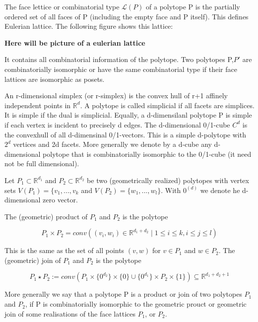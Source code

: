The face lettice or combinatorial type $\mathcal{L}(P)$ of a polytope P is the partially ordered set of all faces of P (including the empty face and P itself). This defines Eulerian lattice. The following figure shows this lattice:

\textbf{Here will be picture of a eulerian lattice}

It contains all combinatorial information of the polytope. Two polytopes P,$P'$ are combinatorially isomorphic or have the same combinatorial type if their face lattices are isomorphic as posets.

An r-dimensional simplex (or r-simplex) is the convex hull of r+1 affinely independent points in $\mathbb{R}^d$. A polytope is called simplicial if all facets are simplices. It is simple if the dual is simplicial. Equally, a d-dimensilanl polytope P is simple if each vertex is incident to precisely d edges. The d-dimensional 0/1-cube $C^d$ is the convexhull of all d-dimensinal 0/1-vectors. This is a simple d-polytope with $2^d$ vertices and 2d facets. More generally we denote by a d-cube any d-dimensional polytope that is combinatorially isomorphic to the 0/1-cube (it need not be full dimensional).

Let $P_1 \subset \mathbb{R}^{d_1}$ and $P_2 \subset \mathbb{R}^{d_2}$ be two (geometrically realized) polytopes with vertex sets $V(P_1)=\{ v_1,...,v_k$ and $V(P_2)=\{ w_1,...,w_l \}$. With $0^{(d)}$ we denote he d-dimensional zero vector.

The (geometric) product of $P_1$ and $P_2$ is the polytope

\begin{equation}
P_1 \times P_2 = conv( (v_i,w_i)\in \mathbb{R}^{d_1+d_2}\mid 1\leq i \leq k, i \leq j \leq l)
\label{eqn:Einstein}
\end{equation}

This is the same as the set of all points $(v,w)$ for $v \in P_1$ and $w \in P_2$. The (geometric) join of $P_1$ and $P_2$ is the polytope

\begin{equation}
P_1 \star P_2 := conv(P_1 \times \{ 0^{d_2} \} \times \{ 0 \} \cup \{ 0^{d_1} \} \times P_2 \times \{ 1 \} ) \subseteq \mathbb{R}^{d_1+d_2+1}
\label{eqn:Einstein}
\end{equation}

More generally we say that a polytope P is a product or join of two polytopes $P_1$ and $P_2$, if P is combinatorially isomorphic to the geometric prouct or geometric join of some realisations of the face lattices $P_1$, or $P_2$.

